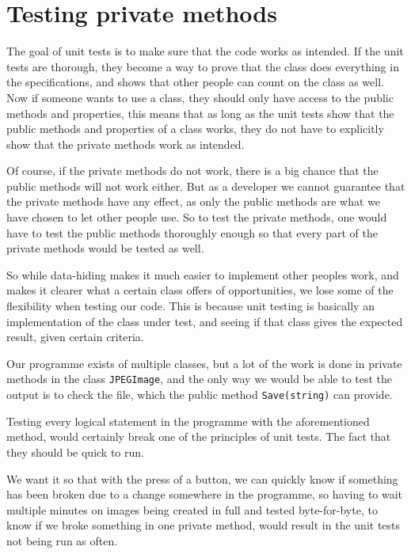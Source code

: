\section{Testing private methods}
The goal of unit tests is to make sure that the code works as intended.
If the unit tests are thorough, they become a way to prove that the class does everything in the specifications, and shows that other people can count on the class as well.
Now if someone wants to use a class, they should only have access to the public methods and properties, this means that as long as the unit tests show that the public methods and properties of a class works, they do not have to explicitly show that the private methods work as intended.

Of course, if the private methods do not work, there is a big chance that the public methods will not work either.
But as a developer we cannot guarantee that the private methods have any effect, as only the public methods are what we have chosen to let other people use. 
So to test the private methods, one would have to test the public methods thoroughly enough so that every part of the private methods would be tested as well. 

So while data-hiding makes it much easier to implement other peoples work, and makes it clearer what a certain class offers of opportunities, we lose some of the flexibility when testing our code. This is because unit testing is basically an implementation of the class under test, and seeing if that class gives the expected result, given certain criteria. 

Our programme exists of multiple classes, but a lot of the work is done in private methods in the class \lstinline|JPEGImage|, and the only way we would be able to test the output is to check the file, which the public method \lstinline|Save(string)| can provide.

Testing every logical statement in the programme with the aforementioned method, would certainly break one of the principles of unit tests. The fact that they should be quick to run.

We want it so that with the press of a button, we can quickly know if something has been broken due to a change somewhere in the programme, so having to wait multiple minutes on images being created in full and tested byte-for-byte, to know if we broke something in one private method, would result in the unit tests not being run as often. 

